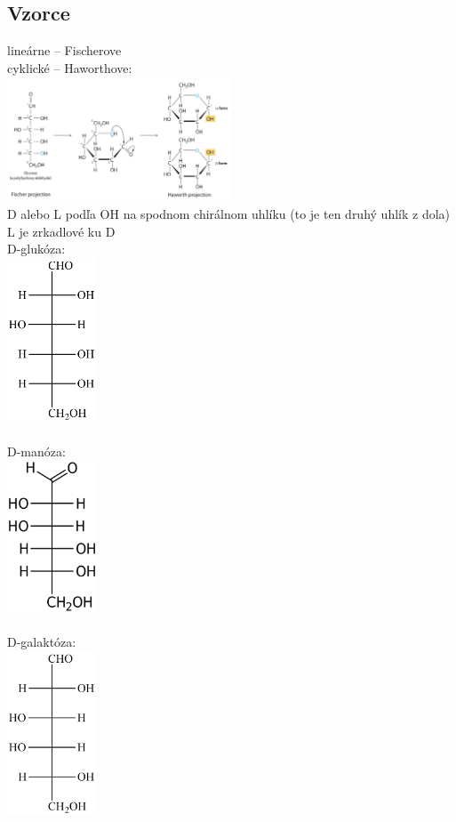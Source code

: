 \subsection{Vzorce}
lineárne -- Fischerove\\
\tab cyklické -- Haworthove: \\

\includegraphics[width=0.5\textwidth]{images/fischer_to_haworth_sacharidy}
\\
D alebo L podľa OH na spodnom chirálnom uhlíku (to je ten druhý uhlík z dola)\\
L je zrkadlové ku D\\
\tab D-glukóza:\\
\includegraphics[width=0.2\textwidth]{images/glucose}\\
\\
\tab D-manóza:\\
\includegraphics[width=0.2\textwidth]{images/mannose}\\
\\
\tab D-galaktóza:\\
\includegraphics[width=0.2\textwidth]{images/galactose}\\
